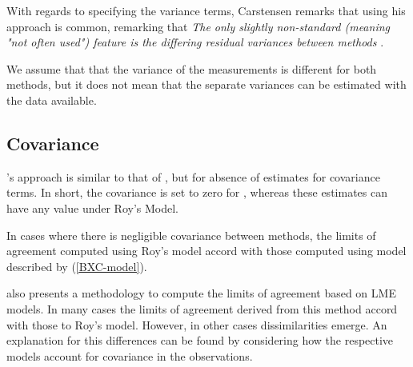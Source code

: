 \documentclass[12pt, a4paper]{report}
\theoremstyle{plain}
\theoremstyle{definition}
\theoremstyle{remark}
\begin{document}




With regards to specifying the variance terms, Carstensen remarks that using his approach is common, remarking that \emph{
	The only slightly non-standard (meaning "not often used") feature is the differing residual variances between methods }\citep{BXC2010}.




We assume that that the variance of the measurements is different for both methods, but it does not mean that the separate variances can be estimated with the data available.












\subsection{Covariance}
\citet{BXC2008}'s approach is similar to that of \citet{ARoy2009}, but for absence of estimates for covariance terms. In short, the covariance is set to zero for \citet{BXC2008}, whereas these estimates can have any value under Roy's Model. 

In cases where there is negligible covariance between methods, the limits of agreement computed using Roy's model accord with those computed using model described by (\ref{BXC-model}). 

\citet{BXC2008} also presents a methodology to compute the limits of agreement based on LME models. In many cases the limits of agreement derived from this method accord with those to Roy's model. However, in other cases dissimilarities emerge. An explanation for this differences can be found by considering how the respective models account for covariance in the observations. 
\end{document}
